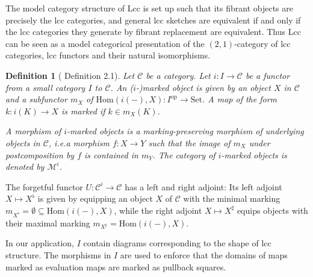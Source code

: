 \documentclass{article}
\newtheorem{definition}{Definition}
\begin{document}
The model category structure of $\mathrm{Lcc}$ is set up such that its fibrant objects are precisely the lcc categories, and general lcc sketches are equivalent if and only if the lcc categories they generate by fibrant replacement are equivalent.
Thus $\mathrm{Lcc}$ can be seen as a model categorical presentation of the $(2, 1)$-category of lcc categories, lcc functors and their natural isomorphisms.

\begin{definition}[\cite{marked-objects} Definition 2.1]
  Let $\mathcal{C}$ be a category.
  Let $i : I \rightarrow \mathcal{C}$ be a functor from a small category $I$ to $\mathcal{C}$.
  An \emph{($i$-)marked object} is given by an object $X$ in $\mathcal{C}$ and a subfunctor $m_X$ of $\mathrm{Hom}(i(-), X) : I^\mathrm{op} \rightarrow \mathrm{Set}$.
  A map of the form $k : i(K) \rightarrow X$ is \emph{marked} if $k \in m_X(K)$.

  A morphism of $i$-marked objects is a marking-preserving morphism of underlying objects in $\mathcal{C}$, i.e.\@ a morphism $f : X \rightarrow Y$ such that the image of $m_X$ under postcomposition by $f$ is contained in $m_Y$.
  The category of $i$-marked objects is denoted by $\mathcal{M}^i$.
\end{definition}

The forgetful functor $U : \mathcal{C}^i \rightarrow \mathcal{C}$ has a left and right adjoint:
Its left adjoint $X \mapsto X^\flat$ is given by equipping an object $X$ of $\mathcal{C}$ with the minimal marking $m_{X^\flat} = \emptyset \subseteq \mathrm{Hom}(i(-), X)$, while the right adjoint $X \mapsto X^\sharp$ equips objects with their maximal marking $m_{X^\sharp} = \mathrm{Hom}(i(-), X)$.

In our application, $I$ contain diagrams corresponding to the shape of lcc structure.
The morphisms in $I$ are used to enforce that the domains of maps marked as evaluation maps are marked as pullback squares.
\end{document}
